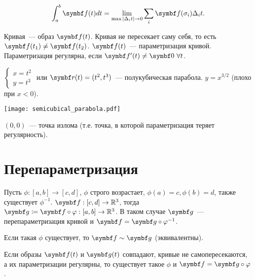 \documentclass[main]{subfiles}
\begin{document}
\begin{definition}
    \[\int_a^b \vf(t) dt = \lim_{\max |\Delta_i t| \to 0} \sum_i \vf(\sigma_i) \Delta_i t.\]
\end{definition}
\begin{definition}[Кривая]
    Кривая~--- образ $\vf(t)$.
    Кривая не пересекает саму себя, то есть $\vf(t_1) \neq \vf(t_2)$.
    $\vf(t)$~--- параметризация кривой.
    Параметризация регулярна, если $\vf'(t) \neq \vzero\ \forall t$.
\end{definition}
\begin{example}
    $\displaystyle \begin{cases}
            x = t^2 \\
            y = t^3
        \end{cases}$ или $\vr(t) = (t^2, t^3)$~---
    полукубическая парабола. $y = x^{3/2}$ (плохо при $x<0$).
    \begin{center}
        \texttt{[image: semicubical\_parabola.pdf]}
    \end{center}

    $(0,0)$~--- точка излома (т.е. точка, в которой параметризация теряет регулярность).
\end{example}

\section{Перепараметризация}
Пусть $\phi: [a,b] \to [c,d]$, $\phi$ строго возрастает, $\phi(a) = c, \phi(b) = d$, также существует $\phi^{-1}$.
$\vf: [c,d] \to \R^3$, тогда $\vg \coloneqq \vf \circ \phi: [a,b] \to \R^3$.
В таком случае $\vg$~--- перепараметризация кривой и $\vf = \vg \circ \phi^{-1}$.

Если такая $\phi$ существует, то $\vf \sim \vg$ (эквивалентны).

Если образы $\vf(t)$ и $\vg(t)$ совпадают, кривые не самопересекаются,
а их параметризации регулярны, то существует такое $\phi$ и $\vf = \vg \circ \phi$.
\end{document}
